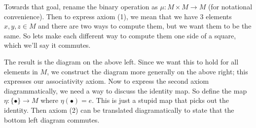 Towards that goal, rename the binary operation as $\mu: M \times M \to M$ (for notational convenience). 
Then to express axiom 
(1), we mean that we have 3 elements $x, y, z \in M$ and there are two ways to compute them, but we  
want them to be the same. So lets make each different way to compute them one side of a square, which 
we'll say it commutes. 
\begin{center}
    \hspace{1cm}
\end{center}
The result is the diagram on the above left. Since we want this to hold for 
all elements in $M$, we construct the diagram more generally on the above right; 
this expresses our associativity axiom. Now to express the second axiom diagrammatically, we need a way to discuss the 
identity map. So define the map $\eta: \{\bullet\} \to M$ where $\eta(\bullet) = e$. This 
is just a stupid map that picks out the identity. Then axiom (2) can be translated 
diagramatically to state that the bottom left diagram commutes. 
